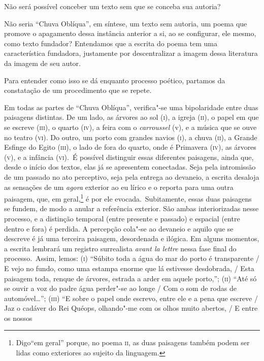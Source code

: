 Não será possível conceber um texto sem que se conceba sua autoria?

Não seria ``Chuva Oblíqua'', em síntese, um texto sem autoria, um poema
que promove o apagamento dessa instância anterior a si, ao se
configurar, ele mesmo, como texto fundador? Entendamos que a escrita do
poema tem uma característica fundadora, justamente por descentralizar a
imagem dessa literatura da imagem de seu autor.

Para entender como isso se dá enquanto processo poético, partamos da
constatação de um procedimento que se repete.

Em todas as partes de ``Chuva Oblíqua'', verifica"-se uma bipolaridade
entre duas paisagens distintas. De um lado, as árvores ao sol
(\textsc{i}), a igreja (\textsc{ii}), o papel em que se escreve
(\textsc{iii}), o quarto (\textsc{iv}), a feira com o \emph{carroussel}
(v), e a música que se ouve no teatro (\textsc{vi}). Do outro, um porto
com grandes navios (\textsc{i}), a chuva (\textsc{ii}), a Grande Esfinge
do Egito (\textsc{iii}), o lado de fora do quarto, onde é Primavera
(\textsc{iv}), as árvores (\textsc{v}), e a infância (\textsc{vi}).~É
possível distinguir essas diferentes paisagens, ainda que, desde o
início dos textos, elas já se apresentem conectadas. Seja pela
intromissão de um passado no ato perceptivo, seja pela entrega ao
devaneio, a escrita desaloja as sensações de um \emph{agora} exterior ao
eu lírico e o reporta para uma outra paisagem, que, em geral,\footnote{Digo``em
  geral'' porque, no poema \textsc{ii}, as duas paisagens também podem
  ser lidas como exteriores ao sujeito da linguagem.} é por ele evocada.~Subitamente, essas duas paisagens se fundem, de modo a anular a referência exterior. São ambas interiorizadas nesse processo, e a
distinção temporal (entre presente e passado) e espacial (entre dentro e
fora) é perdida. A percepção cola"-se ao devaneio e aquilo que se
descreve é já uma terceira paisagem, desordenada e ilógica. Em alguns
momentos, a escrita lembrará um registro surrealista \emph{avant la
lettre} nessa fase final do processo.~Assim, lemos: (\textsc{i})
``Súbito toda a água do mar do porto é transparente / E vejo no fundo,
como uma estampa enorme que lá estivesse desdobrada, / Esta paisagem
toda, renque de árvores, estrada a arder em aquele porto,'';
(\textsc{ii}) ``Até só se ouvir a voz do padre água perder"-se ao longe /
Com o som de rodas de automóvel\ldots{}''; (\textsc{iii}) ``E sobre o papel
onde escrevo, entre ele e a pena que escreve / Jaz o cadáver do Rei
Quéops, olhando"-me com os olhos muito abertos, / E entre os nossos
